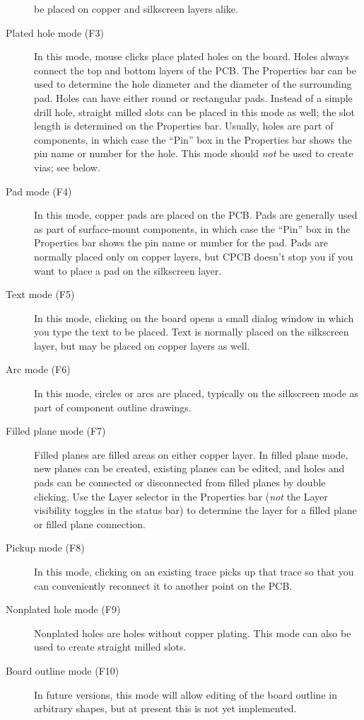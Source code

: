 \documentclass[11pt]{report}
\begin{document}
\begin{description}
    be placed on copper and silkscreen layers alike.
    \item[Plated hole mode (F3)] In this mode, mouse clicks place
      plated holes on the board. Holes always connect the top and
      bottom layers of the PCB. The Properties bar can be used to
      determine the hole diameter and the diameter of the surrounding
      pad. Holes can have either round or rectangular pads. Instead of
      a simple drill hole, straight milled slots can be placed in this
      mode as well; the slot length is determined on the Properties
      bar. Usually, holes are part of components, in which case the
      ``Pin'' box in the Properties bar shows the pin name or number
      for the hole. This mode should \emph{not} be used to create
      vias; see below.
\item[Pad mode (F4)] In this mode, copper pads are placed on the
  PCB. Pads are generally used as part of surface-mount components, in
  which case the ``Pin'' box in the Properties bar shows the pin name
  or number for the pad.  Pads are normally placed only on copper
  layers, but CPCB doesn't stop you if you want to place a pad on the
  silkscreen layer.
\item[Text mode (F5)] In this mode, clicking on the board opens a
  small dialog window in which you type the text to be placed. Text is
  normally placed on the silkscreen layer, but may be placed on copper
  layers as well.
  \item[Arc mode (F6)] In this mode, circles or arcs are placed,
    typically on the silkscreen mode as part of component outline
    drawings.
    \item[Filled plane mode (F7)] Filled planes are filled areas on
      either copper layer. In filled plane mode, new planes can be
      created, existing planes can be edited, and holes and pads can
      be connected or disconnected from filled planes by double
      clicking. Use the Layer selector in the Properties bar
      (\emph{not} the Layer visibility toggles in the status bar) to
      determine the layer for a filled plane or filled plane
      connection.
      \item[Pickup mode (F8)] In this mode, clicking on an existing
        trace picks up that trace so that you can conveniently
        reconnect it to another point on the PCB.
      \item[Nonplated hole mode (F9)] Nonplated holes are holes
        without copper plating. This mode can also be used to create
        straight milled slots.
      \item[Board outline mode (F10)] In future versions, this
        mode will allow editing of the board outline in arbitrary
        shapes, but at present this is not yet implemented.
\end{description}
\end{document}
